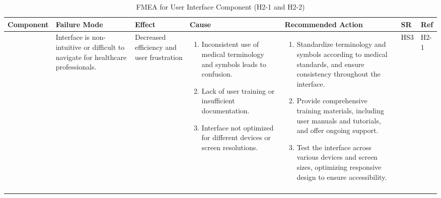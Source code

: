 \documentclass{article}
\begin{document}
\begin{landscape}
    \begin{table}[ht]
    \centering
    \caption{FMEA for User Interface Component (H2-1 and H2-2)}
    \renewcommand{\arraystretch}{1.1}
    {
    \setlength{\tabcolsep}{2pt}
    \begin{tabular}{|p{2.5cm}|p{2.5cm}|p{3cm}|p{5cm}|p{6cm}|p{1cm}|p{1cm}|}
    \hline
    \textbf{Component} & \textbf{Failure Mode} & \textbf{Effect} & \textbf{Cause} & \textbf{Recommended Action} & \textbf{SR} & \textbf{Ref} \\
    \hline

    \multirow{2}{*}{} 
     & Interface is non-intuitive or difficult to navigate for healthcare professionals.
     & Decreased efficiency and user frustration
     &
     \begin{enumerate}[leftmargin=*, label={\alph*.}, itemsep=1pt]
         \item Inconsistent use of medical terminology and symbols leads to confusion.
         \item Lack of user training or insufficient documentation.
         \item Interface not optimized for different devices or screen resolutions.
     \end{enumerate}
     &
     \begin{enumerate}[leftmargin=*, label={\alph*.}, itemsep=1pt]
         \item Standardize terminology and symbols according to medical standards, and ensure consistency throughout the interface.
         \item Provide comprehensive training materials, including user manuals and tutorials, and offer ongoing support.
         \item Test the interface across various devices and screen sizes, optimizing responsive design to ensure accessibility.
     \end{enumerate}
     & HS3 & H2-1 \\ \cline{2-7}


\end{tabular}}
\end{table}
\end{landscape}
\end{document}
